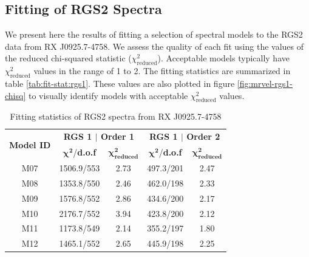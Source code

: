		\subsection{Fitting of RGS2 Spectra} \label{hi-resolution:analysis:rgs2}
			We present here the results of fitting a selection of spectral models to the RGS2 data from RX J0925.7-4758. We assess the quality of each fit using the values of the reduced chi-squared statistic ($\chi^2_\text{reduced}$). Acceptable models typically have $\chi^2_\text{reduced}$ values in the range of 1 to 2. The fitting statistics are summarized in table \ref{tab:fit-stat:rgs1}.  These values are also plotted in figure \ref{fig:mrvel-rgs1-chisq} to visually identify models with acceptable $\chi^2_\text{reduced}$ values.
			\begin{table}[!htb]
				\centering
				\caption{Fitting statistics of RGS2 spectra from RX J0925.7-4758}
				\label{tab:fit-stat:rgs2}
				\begin{tabular}{c|cc|cc}
					\hline
					\multirow{2}{*}{\textbf{Model ID}} & \multicolumn{2}{c|}{\textbf{RGS 1 $\vert$ Order 1}} & \multicolumn{2}{c}{\textbf{RGS 1 $\vert$ Order 2}} \\ \cline{2-5} & {$\boldsymbol{\chi^2}$/\textbf{d.o.f}} & {$\boldsymbol{\chi^2_\text{reduced}}$} & {$\boldsymbol{\chi^2}$/\textbf{d.o.f}} & {$\boldsymbol{\chi^2_\text{reduced}}$} \\ \hline
					{M07} & {1506.9/553} & {2.73} & {497.3/201} & {2.47} \\
					{M08} & {1353.8/550} & {2.46} & {462.0/198} & {2.33} \\
					{M09} & {1576.8/552} & {2.86} & {434.6/200} & {2.17} \\
					{M10} & {2176.7/552} & {3.94} & {423.8/200} & {2.12} \\
					{M11} & {1173.8/549} & {2.14} & {355.2/197} & {1.80} \\
					{M12} & {1465.1/552} & {2.65} & {445.9/198} & {2.25} \\ \hline
				\end{tabular}
			\end{table}
			
